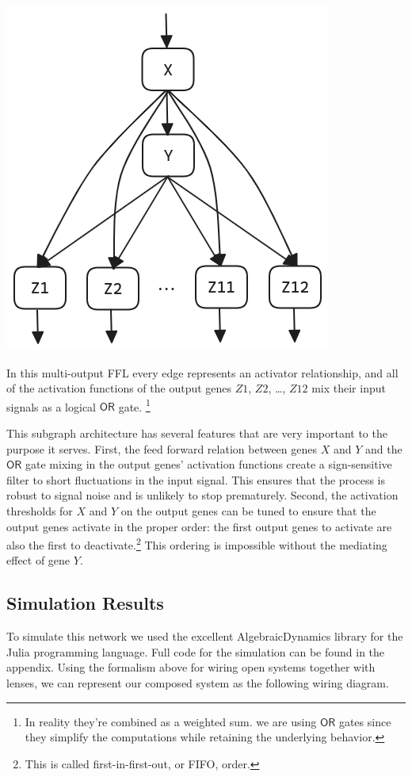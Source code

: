 \documentclass[12pt]{article}
\begin{document}
\begin{center}
    \includegraphics*[scale=0.35]{multioutput_FFL.png}
\end{center}

In this multi-output FFL every edge represents an activator relationship, and all of the activation functions of the output genes $Z1$, $Z2$, \dots, $Z12$ mix their input signals as a logical $\mathsf{OR}$ gate.
\footnote{In reality they're combined as a weighted sum. we are using $\mathsf{OR}$ gates since they simplify the computations while retaining the underlying behavior.}

This subgraph architecture has several features that are very important to the purpose it serves.
First, the feed forward relation between genes $X$ and $Y$ and the $\mathsf{OR}$ gate mixing in the output genes' activation functions create a sign-sensitive filter to short fluctuations in the input signal.
This ensures that the process is robust to signal noise and is unlikely to stop prematurely.
Second, the activation thresholds for $X$ and $Y$ on the output genes can be tuned to ensure that the output genes activate in the proper order: the first output genes to activate are also the first to deactivate.\footnote{This is called first-in-first-out, or FIFO, order.}
This ordering is impossible without the mediating effect of gene $Y$.


\subsection*{Simulation Results}
To simulate this network we used the excellent AlgebraicDynamics library for the Julia programming language.
Full code for the simulation can be found in the appendix.
Using the formalism above for wiring open systems together with lenses, we can represent our composed system as the following wiring diagram.
\end{document}
